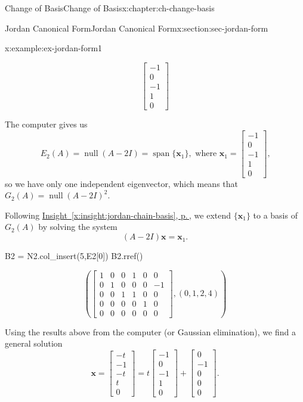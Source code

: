 \documentclass[oneside,10pt,]{book}
\newcommand{\xreffont}{\relax}
\numberwithin{equation}{section}
\newcommand{\spn}{\operatorname{span}}
\newcommand{\bbm}{\begin{bmatrix}}
\newcommand{\ebm}{\end{bmatrix}}
\newcommand{\nll}{\operatorname{null}}
\newcommand{\xx}{\mathbf{x}}
\newcommand{\amp}{&}
\begin{document}
\begin{chapterptx}{Change of Basis}{}{Change of Basis}{}{}{x:chapter:ch-change-basis}
\begin{sectionptx}{Jordan Canonical Form}{}{Jordan Canonical Form}{}{}{x:section:sec-jordan-form}
\begin{example}{}{x:example:ex-jordan-form1}
\begin{sageinput}
\end{sageinput}
\begin{sageoutput}
\[\bbm -1\\0\\-1\\1\\0\ebm\]
\end{sageoutput}
The computer gives us%
\begin{equation*}
E_2(A)=\nll(A-2I) = \spn\{\xx_1\}, \text{ where } \xx_1=\bbm -1\\0\\-1\\1\\0\ebm\text{,}
\end{equation*}
so we have only one independent eigenvector, which means that \(G_2(A)=\nll(A-2I)^2\).%
\par
Following \hyperref[x:insight:jordan-chain-basis]{Insight~{\xreffont\ref{x:insight:jordan-chain-basis}}, p.\,\pageref{x:insight:jordan-chain-basis}}, we extend \(\{\xx_1\}\) to a basis of \(G_2(A)\) by solving the system%
\begin{equation*}
(A-2I)\xx = \xx_1\text{.}
\end{equation*}
%
\begin{sageinput}
B2 = N2.col_insert(5,E2[0])
B2.rref()
\end{sageinput}
\begin{sageoutput}
\[\left(\bbm 1\amp 0\amp 0 \amp 1\amp 0\amp 0\\0\amp 1\amp 0\amp 0\amp 0\amp -1\\0\amp 0\amp 1\amp 1\amp 0\amp 0\\
0\amp 0\amp 0\amp 0\amp 1\amp 0\\0\amp 0\amp 0\amp 0\amp 0\amp 0\ebm,(0,1,2,4)\right)\]
\end{sageoutput}
Using the results above from the computer (or Gaussian elimination), we find a general solution%
\begin{equation*}
\xx = \bbm -t\\-1\\-t\\t\\0\ebm = t\bbm -1\\0\\-1\\1\\0\ebm + \bbm 0\\-1\\0\\0\\0\ebm\text{.}

\end{equation*}
\end{example}
\end{sectionptx}
\end{chapterptx}
\end{document}
